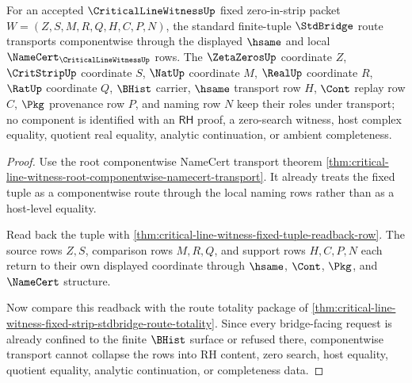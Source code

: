\begin{theorem}
\label{thm:critical-line-witness-componentwise-stdbridge-transport}
For an accepted $\CriticalLineWitnessUp$ fixed zero-in-strip packet $W=(Z,S,M,R,Q,H,C,P,N)$, the standard finite-tuple $\StdBridge$ route transports componentwise through the displayed $\hsame$ and local $\NameCert_{\CriticalLineWitnessUp}$ rows. The $\ZetaZerosUp$ coordinate $Z$, $\CritStripUp$ coordinate $S$, $\NatUp$ coordinate $M$, $\RealUp$ coordinate $R$, $\RatUp$ coordinate $Q$, $\BHist$ carrier, $\hsame$ transport row $H$, $\Cont$ replay row $C$, $\Pkg$ provenance row $P$, and naming row $N$ keep their roles under transport; no component is identified with an $\mathsf{RH}$ proof, a zero-search witness, host complex equality, quotient real equality, analytic continuation, or ambient completeness.
\end{theorem}
\begin{proof}
Use the root componentwise NameCert transport theorem \autoref{thm:critical-line-witness-root-componentwise-namecert-transport}. It already treats the fixed tuple as a componentwise route through the local naming rows rather than as a host-level equality.

Read back the tuple with \autoref{thm:critical-line-witness-fixed-tuple-readback-row}. The source rows $Z,S$, comparison rows $M,R,Q$, and support rows $H,C,P,N$ each return to their own displayed coordinate through $\hsame$, $\Cont$, $\Pkg$, and $\NameCert$ structure.

Now compare this readback with the route totality package of \autoref{thm:critical-line-witness-fixed-strip-stdbridge-route-totality}. Since every bridge-facing request is already confined to the finite $\BHist$ surface or refused there, componentwise transport cannot collapse the rows into RH content, zero search, host equality, quotient equality, analytic continuation, or completeness data.
\end{proof}

